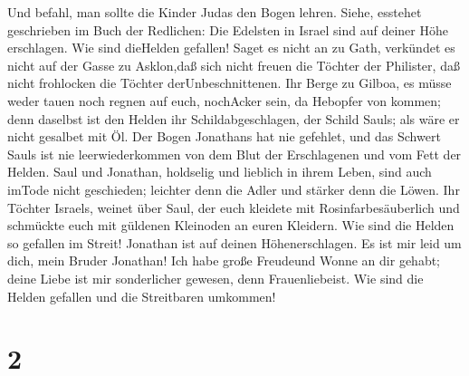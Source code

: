  Und befahl, man sollte die Kinder Judas den Bogen lehren.
Siehe, esstehet geschrieben im Buch der Redlichen:  Die
Edelsten in Israel sind auf deiner Höhe erschlagen. Wie sind dieHelden
gefallen!  Saget es nicht an zu Gath, verkündet es nicht
auf der Gasse zu Asklon,daß sich nicht freuen die Töchter der Philister,
daß nicht frohlocken die Töchter derUnbeschnittenen.  Ihr
Berge zu Gilboa, es müsse weder tauen noch regnen auf euch, nochAcker
sein, da Hebopfer von kommen; denn daselbst ist den Helden ihr
Schildabgeschlagen, der Schild Sauls; als wäre er nicht gesalbet mit Öl.
 Der Bogen Jonathans hat nie gefehlet, und das Schwert
Sauls ist nie leerwiederkommen von dem Blut der Erschlagenen und vom
Fett der Helden.  Saul und Jonathan, holdselig und lieblich
in ihrem Leben, sind auch imTode nicht geschieden; leichter denn die
Adler und stärker denn die Löwen.  Ihr Töchter Israels,
weinet über Saul, der euch kleidete mit Rosinfarbesäuberlich und
schmückte euch mit güldenen Kleinoden an euren Kleidern. 
Wie sind die Helden so gefallen im Streit! Jonathan ist auf deinen
Höhenerschlagen.  Es ist mir leid um dich, mein Bruder
Jonathan! Ich habe große Freudeund Wonne an dir gehabt; deine Liebe ist
mir sonderlicher gewesen, denn Frauenliebeist.  Wie sind
die Helden gefallen und die Streitbaren umkommen!

\hypertarget{section-1}{%
\section{2}\label{section-1}}

